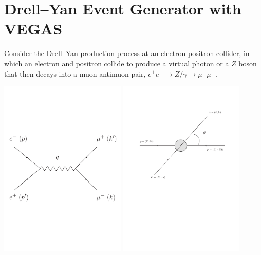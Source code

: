 \newpage
\section{Drell--Yan Event Generator with VEGAS}

Consider the Drell--Yan production process at an electron-positron collider, in which an electron and positron collide to produce a virtual photon or a $Z$ boson that then decays into a muon-antimuon pair, $e^+e^-\to Z/\gamma \to \mu^+\mu^-$.

\begin{center}
  \includegraphics[width=0.45\textwidth]{eemumu.pdf}
  \includegraphics[width=0.45\textwidth]{eemumukin.pdf}
\end{center}

